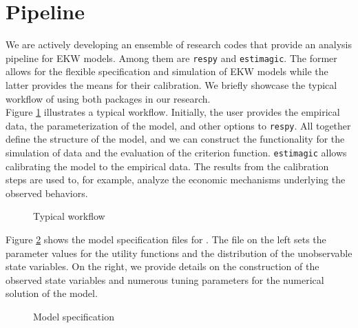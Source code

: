 \section{Pipeline}
We are actively developing an ensemble of research codes that provide an analysis pipeline for EKW models. Among them are \verb+respy+ and \verb+estimagic+. The former allows for the flexible specification and simulation of EKW models while the latter provides the means for their calibration. We briefly showcase the typical workflow of using both packages in our research.\\

\noindent Figure \ref{Typical workflow} illustrates a typical workflow. Initially, the user provides the empirical data, the parameterization of the model, and other options to \verb+respy+. All together define the structure of the model, and we can construct the functionality for the simulation of data and the evaluation of the criterion function. \verb+estimagic+ allows calibrating the model to the empirical data. The results from the calibration steps are used to, for example, analyze the economic mechanisms underlying the observed behaviors.

\begin{figure}[ht!]\centering
\caption{Typical workflow}\label{Typical workflow}

\end{figure}\FloatBarrier

\noindent Figure \ref{Model specification} shows the model specification files for \citet{Keane.1997}. The file on the left sets the parameter values for the utility functions and the distribution of the unobservable state variables. On the right, we provide details on the construction of the observed state variables and numerous tuning parameters for the numerical solution of the model.

\begin{figure}[h!]\centering
	\captionsetup[subfloat]{captionskip=12pt}
	\caption{Model specification}\label{Model specification}
	\hfill
\end{figure}\FloatBarrier

